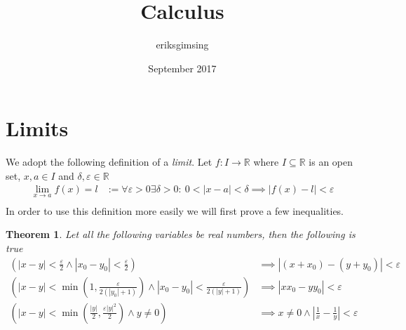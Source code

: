 \documentclass{article}
\title{Calculus}
\author{eriksgimsing }
\date{September 2017}
\theoremstyle{plain}
\newtheorem{theorem}{Theorem}
\theoremstyle{definition}
\begin{document}
\maketitle
\section{Limits}
We adopt the following definition of a \textit{limit}. Let $f: I
\rightarrow \mathbb{R}$ where $I \subseteq \mathbb{R}$ is an open set,
$x,a \in I$ and $\delta,\varepsilon \in \mathbb{R}$
\begin{align*}
    \lim_{x \rightarrow a} f(x) = l &:= \forall \varepsilon > 0 \exists
    \delta > 0:\  0 < |x-a| < \delta \implies |f(x)-l| < \varepsilon \\
\end{align*}  
In order to use this definition more easily we will first prove a few
inequalities.
\begin{theorem}
Let all the following variables be real numbers, then the following is true
\begin{align*}
    \left(|x-y| < \frac{\varepsilon}{2} \land |x_0-y_0| <
    \frac{\varepsilon}{2}\right)
        &\implies |(x+x_0)-(y+y_0)| < \varepsilon \\
    \left(|x-y| < \min \left(1, \frac{\varepsilon}{2(|y_0|+1)} \right)
    \land |x_0-y_0| < \frac{\varepsilon}{2(|y|+1)}\right)
        &\implies |xx_0-yy_0| < \varepsilon \\
    \left(|x-y| < \min \left( \frac{|y|}{2},
    \frac{\varepsilon|y|^2}{2}\right) \land y \neq 0 \right)
        &\implies x \neq 0 \land \left| \frac{1}{x} - \frac{1}{y}\right|
        < \varepsilon
\end{align*}
\end{theorem}
\end{document}
